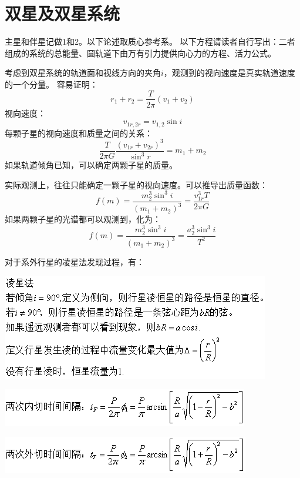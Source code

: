 \section{双星及双星系统}
主星和伴星记做1和2。以下论述取质心参考系。
以下方程请读者自行写出：二者组成的系统的总能量、圆轨道下由万有引力提供向心力的方程、活力公式。

考虑到双星系统的轨道面和视线方向的夹角$i$，观测到的视向速度是真实轨道速度的一个分量。
容易证明：
\begin{equation}
	r_{1}+r_{2}=\frac{T}{2\pi}\left(v_{1}+v_{2}\right)
\end{equation}
视向速度：
\begin{equation}
	v_{1r,2r}=v_{1,2}\sin i
\end{equation}
每颗子星的视向速度和质量之间的关系：
\begin{equation}
	\frac{T}{2\pi G}\frac{\left(v_{1r}+v_{2r}\right)^3}{\sin ^3 r}=m_{1}+m_{2}
\end{equation}
如果轨道倾角已知，可以确定两颗子星的质量。

实际观测上，往往只能确定一颗子星的视向速度。可以推导出质量函数：
\begin{equation}
	f(m)=\frac{m_{2}^3\sin^3i}{\left(m_{1}+m_{2}\right)^3}=\frac{v_{1r}^3T}{2\pi G}
\end{equation}
如果两颗子星的光谱都可以观测到，化为：
\begin{equation}
	f(m)=\frac{m_{2}^3\sin^3i}{\left(m_{1}+m_{2}\right)^3}=\frac{a_{2}^3\sin^3 i}{T^2}
\end{equation}


对于系外行星的凌星法发现过程，有：

\includegraphics{A_1.png}

\includegraphics{A_2.png}

\includegraphics{A_3.png}

